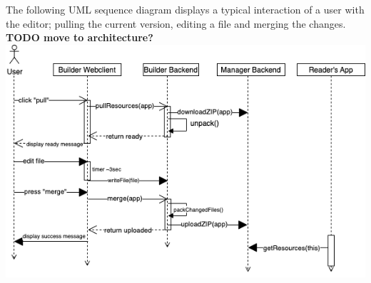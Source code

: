 The following UML sequence diagram displays a typical interaction of a user with the editor; pulling the current version, editing a file and merging the changes.
\textbf{TODO move to architecture?}
\includegraphics[width=\textwidth]{pics/user-flow.uml.drawio.png}